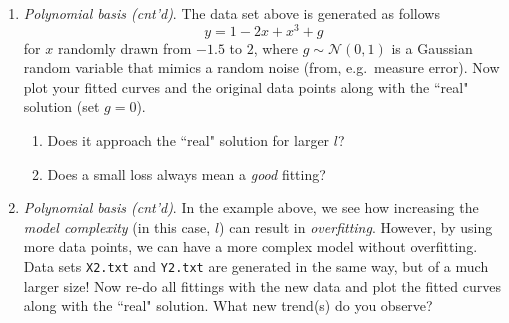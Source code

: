\documentclass[a4paper,twoside, 10pt]{article}
\theoremstyle{wick}
\newcommand{\ttt}{\texttt}
\begin{document}
\begin{enumerate}
		\item \textit{Polynomial basis (cnt'd)}. The data set above is generated as follows
		\begin{equation}
			y
				= 1 - 2x + x^3 + g
		\end{equation}
		for $x$ randomly drawn from $-1.5$ to $2$, where $g \sim \mathcal{N}(0, 1)$ is a Gaussian random variable that mimics a random noise (from, e.g.\ measure error). Now plot your fitted curves and the original data points along with the ``real" solution (set $g = 0$).
		\begin{enumerate}
			\item Does it approach the ``real" solution for larger $l$?
			\item Does a small loss always mean a \emph{good} fitting?
		\end{enumerate}

		\item \textit{Polynomial basis (cnt'd)}. In the example above, we see how increasing the \emph{model complexity} (in this case, $l$) can result in \emph{overfitting}. However, by using more data points, we can have a more complex model without overfitting. Data sets \ttt{X2.txt} and \ttt{Y2.txt} are generated in the same way, but of a much larger size! Now re-do all fittings with the new data and plot the fitted curves along with the ``real" solution. What new trend(s) do you observe?
	\end{enumerate}
\end{document}
